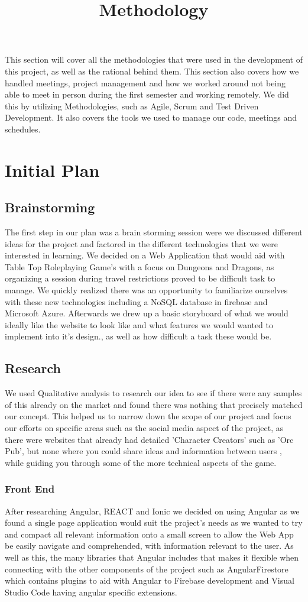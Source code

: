 \title{Methodology}
 This section will cover all the methodologies that were used in the development of this project, as
 well as the rational behind them. This section also covers how we handled meetings, project management and how we worked around not being able to meet in person during the first semester and working remotely. We did this by utilizing Methodologies, such as Agile, Scrum and Test Driven Development. It also covers the tools we used to manage our code, meetings and schedules.
 
\section{Initial Plan}
\subsection{Brainstorming}
The first step in our plan was a brain storming session were we discussed different ideas for the project and factored in the different technologies that we were interested in learning. We decided on a Web Application that would aid with Table Top Roleplaying Game's with a focus on Dungeons and Dragons, as organizing a session during travel restrictions proved to be difficult task to manage. We quickly realized there was an opportunity to familiarize ourselves with these new technologies including a NoSQL database in firebase and Microsoft Azure. Afterwards we drew up a basic storyboard of what we would ideally like the website to look like and what features we would wanted to implement into it's design., as well as how difficult a task these would be.

\subsection{Research}
We used Qualitative analysis to research our idea to see if there were any samples of this already on the market and found there was nothing that precisely matched our concept. This helped us to narrow down the scope of our project and focus our efforts on specific areas such as the social media aspect of the project, as there were websites that already had detailed 'Character Creators' such as 'Orc Pub', but none where you could share ideas and information between users , while guiding you through some of the more technical aspects of the game.

\subsubsection{Front End}
After researching Angular, REACT and Ionic we decided on using Angular as we found a single page application would suit the project's needs as we wanted to try and compact all relevant information onto a small screen  to allow the Web App be easily navigate and comprehended, with information relevant to the user. As well as this, the many libraries that Angular includes that makes it flexible when connecting with the other components of the project such as AngularFirestore which contains plugins to aid with Angular to Firebase development and Visual Studio Code having angular specific extensions.

